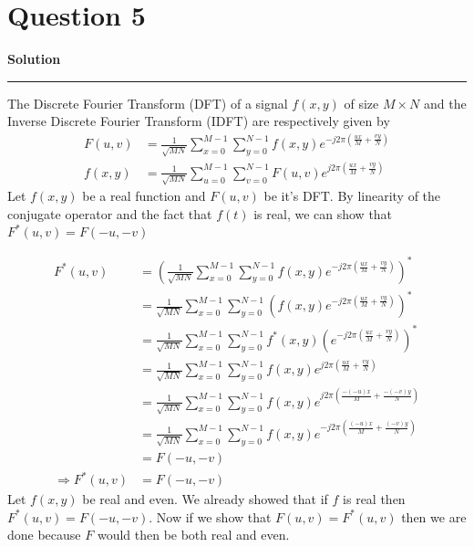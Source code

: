\documentclass[a4paper]{article}
\title{\cooltitle{CS663 Assignment-3}}
\author{{\bf Saksham Rathi, Kavya Gupta, Shravan Srinivasa Raghavan} \\
\small Department of Computer Science, \\
Indian Institute of Technology Bombay \\}
\date{}
\newenvironment{solution}[2][]{%
    \begin{mdframed}[linecolor=green!60!black, linewidth=2pt, roundcorner=10pt, backgroundcolor=green!5!white, skipabove=12pt, skipbelow=12pt]%
        \textbf{\large #2} %
        \par\noindent\rule{\textwidth}{0.4pt} %
        \vspace{0.5em} %
}{%
    \end{mdframed}%
}
\begin{document}
\maketitle
\section*{Question 5}

\begin{solution}{Solution}
  The Discrete Fourier Transform (DFT) of a signal $f(x,y)$ of size $M \times N$ and the 
  Inverse Discrete Fourier Transform (IDFT) are respectively given by 
  \begin{align*}
    F(u,v) &= \frac{1}{\sqrt{MN}}\sum\limits_{x = 0}^{M - 1}\sum\limits_{y = 0}^{N - 1} f(x,y) e^{-j2\pi \left(\frac{ux}{M} + \frac{vy}{N}\right)}  \\  
    f(x,y) &= \frac{1}{\sqrt{MN}}\sum\limits_{u = 0}^{M - 1}\sum\limits_{v = 0}^{N - 1} F(u,v) e^{j2\pi \left(\frac{ux}{M} + \frac{vy}{N}\right)}
  \end{align*}
  Let $f(x,y)$ be a real function and $F(u,v)$ be it's DFT\@. By linearity of the conjugate operator and the fact that $f(t)$ 
  is real, we can show that $F^{*}(u,v) = F(-u,-v)$
  
  \begin{align*}
    F^{*}(u,v) &= {\left(\frac{1}{\sqrt{MN}}\sum\limits_{x = 0}^{M - 1}\sum\limits_{y = 0}^{N - 1} 
    f(x,y) e^{-j2\pi \left(\frac{ux}{M} + \frac{vy}{N}\right)}\right)}^{*} \\
    &= \frac{1}{\sqrt{MN}}\sum\limits_{x = 0}^{M - 1}\sum\limits_{y = 0}^{N - 1} 
    {\left(f(x,y) e^{-j2\pi \left(\frac{ux}{M} + \frac{vy}{N}\right)}\right)}^{*} \\
    &= \frac{1}{\sqrt{MN}}\sum\limits_{x = 0}^{M - 1}\sum\limits_{y = 0}^{N - 1} 
    f^{*}(x,y) {\left(e^{-j2\pi \left(\frac{ux}{M} + \frac{vy}{N}\right)}\right)}^{*} \\
    &= \frac{1}{\sqrt{MN}}\sum\limits_{x = 0}^{M - 1}\sum\limits_{y = 0}^{N - 1} 
    f(x,y) e^{j2\pi \left(\frac{ux}{M} + \frac{vy}{N}\right)} \\
    &= \frac{1}{\sqrt{MN}}\sum\limits_{x = 0}^{M - 1}\sum\limits_{y = 0}^{N - 1} 
    f(x,y) e^{j2\pi \left(\frac{-(-u)x}{M} + \frac{-(-v)y}{N}\right)} \\ 
    &= \frac{1}{\sqrt{MN}}\sum\limits_{x = 0}^{M - 1}\sum\limits_{y = 0}^{N - 1} 
    f(x,y) e^{-j2\pi \left(\frac{(-u)x}{M} + \frac{(-v)y}{N}\right)} \\
    &= F(-u,-v) \\
    \Rightarrow F^{*}(u,v) &= F(-u,-v)
  \end{align*}
  Let $f(x,y)$ be real and even. We already showed that if $f$ is real then $F^{*}(u,v) = F(-u,-v)$. Now if we show that 
  $F(u,v) = F^{*}(u,v)$ then we are done because $F$ would then be both real and even. 


\end{solution}
\end{document}
